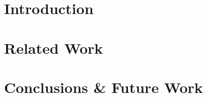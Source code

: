 \documentclass[12pt,leqno,a4paper]{article}
\begin{document}
\section{Introduction}

\section{Related Work}




\section{Conclusions \& Future Work}
\end{document}
